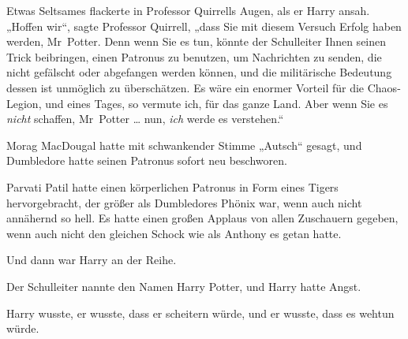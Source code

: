 Etwas Seltsames flackerte in Professor Quirrells Augen, als er Harry ansah.
„Hoffen wir“, sagte Professor Quirrell, „dass Sie mit diesem Versuch Erfolg haben werden, Mr~Potter. Denn wenn Sie es tun, könnte der Schulleiter Ihnen seinen Trick beibringen, einen Patronus zu benutzen, um Nachrichten zu senden, die nicht gefälscht oder abgefangen werden können, und die militärische Bedeutung dessen ist unmöglich zu überschätzen. Es wäre ein enormer Vorteil für die Chaos-Legion, und eines Tages, so vermute ich, für das ganze Land. Aber wenn Sie es \emph{nicht} schaffen, Mr~Potter … nun, \emph{ich} werde es verstehen.“

\later

Morag MacDougal hatte mit schwankender Stimme
„Autsch“ gesagt, und Dumbledore hatte seinen Patronus sofort neu beschworen.

Parvati Patil hatte einen körperlichen Patronus in Form eines Tigers hervorgebracht, der größer als Dumbledores Phönix war, wenn auch nicht annähernd so hell. Es hatte einen großen Applaus von allen Zuschauern gegeben, wenn auch nicht den gleichen Schock wie als Anthony es getan hatte.

Und dann war Harry an der Reihe.

Der Schulleiter nannte den Namen Harry Potter, und Harry hatte Angst.

Harry wusste, er wusste, dass er scheitern würde, und er wusste, dass es wehtun würde.

